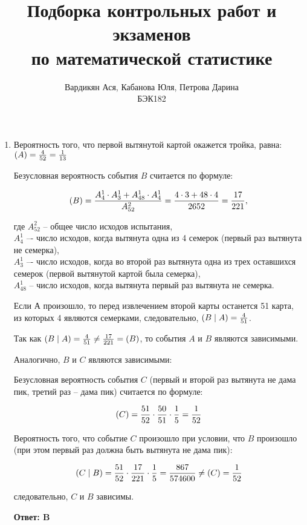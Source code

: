 \documentclass[112pt, cmcyralt]{article}
\title{Подборка контрольных работ и экзаменов\\
по математической статистике}
\author{Вардикян Ася, Кабанова Юля, Петрова Дарина \\ БЭК182}
\let\P\relax
\DeclareMathOperator{\P}{\mathbb{P}}
\begin{document}
\maketitle
\newpage
\begin{enumerate}

\section{Промежуточный экзамен 2016-2017 гг}

\item
Вероятность того, что первой вытянутой картой окажется тройка, равна: $\P(A)=\frac{4}{52}=\frac{1}{13}$

Безусловная вероятность события $B$ считается по формуле:

\[
\P(B)=\frac{A_4^1\cdot A_3^1+A_{48}^1\cdot A_4^1}{A_{52}^2}=\frac{4\cdot3 + 48\cdot4}{2652} = \frac{17}{221},
\]

где 
$A_{52}^2$ -- общее число исходов испытания,\\
$A_4^1$ –- число исходов, когда вытянута одна из 4 семерок (первый раз вытянута не семерка),\\
$A_3^1$ –- число исходов, когда во второй раз вытянута одна из трех оставшихся семерок (первой вытянутой картой была семерка), \\
$A_{48}^1$ -- число исходов, когда вытянута первый раз вытянута не семерка.

Если А произошло, то перед извлечением второй карты останется 51 карта, из которых 4 являются семерками, следовательно, $\P(B\mid A)=\frac{4}{51}$.

Так как $\P(B\mid A)=\frac{4}{51} \neq \frac{17}{221}=\P(B)$, то события $A$ и $B$ являются зависимыми.

Аналогично, $B$ и $C$ являются зависимыми:

Безусловная вероятность события $C$ (первый и второй раз вытянута не дама пик, третий раз -- дама пик) считается по формуле:

\[
\P(C)=\frac{51}{52}\cdot\frac{50}{51}\cdot\frac{1}{5}=\frac{1}{52}
\]

Вероятность того, что событие $C$ произошло при условии, что $B$ произошло (при этом первый раз должна быть вытянута не дама пик):

\[
\P(C\mid B)=\frac{51}{52}\cdot\frac{17}{221}\cdot\frac{1}{5}=\frac{867}{574600}\neq\P(C)=\frac{1}{52}
\] 

следовательно, $C$ и $B$ зависимы.

\textbf{Ответ: B}



\end{enumerate}
\end{document}
